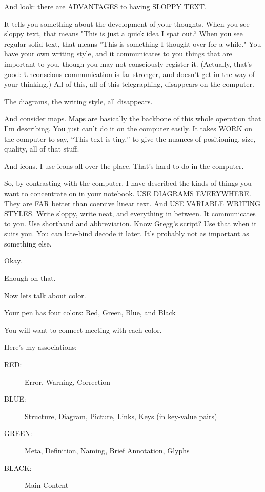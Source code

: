 \documentclass[oneside,fontsize=10,a5paper]{scrbook}
\newcommand\pause{\bigskip\noindent}
\begin{document}
And look: there are ADVANTAGES to having SLOPPY TEXT.

It tells you something about the development of your thoughts. When
you see sloppy text, that means "This is just a quick idea I spat
out.`` When you see regular solid text, that means ''This is something I
thought over for a while." You have your own writing style, and it
communicates to you things that are important to you, though you may
not consciously register it. (Actually, that's good: Unconscious
communication is far stronger, and doesn't get in the way of your
thinking.) All of this, all of this telegraphing, disappears on the
computer.

The diagrams, the writing style, all disappears.

And consider maps. Maps are basically the backbone of this whole
operation that I'm describing. You just can't do it on the computer
easily. It takes WORK on the computer to say, ``This text is tiny,'' to
give the nuances of positioning, size, quality, all of that stuff.

And icons. I use icons all over the place. That's hard to do in the
computer.

So, by contrasting with the computer, I have described the kinds of
things you want to concentrate on in your notebook. USE DIAGRAMS
EVERYWHERE. They are FAR better than coercive linear text. And USE
VARIABLE WRITING STYLES. Write sloppy, write neat, and everything in
between. It communicates to you. Use shorthand and abbreviation. Know
Gregg's script? Use that when it suits you. You can late-bind decode
it later. It's probably not as important as something else.

\pause 

Okay.

Enough on that.

Now lets talk about color.

Your pen has four colors: Red, Green, Blue, and Black

You will want to connect meeting with each color.

Here's my associations:

\begin{description}
  \item[RED:]     Error, Warning, Correction
  \item[BLUE:]    Structure, Diagram, Picture, Links, Keys (in key-value pairs)
  \item[GREEN:]   Meta, Definition, Naming, Brief Annotation, Glyphs
  \item[BLACK:]   Main Content
\end{description}
\end{document}
